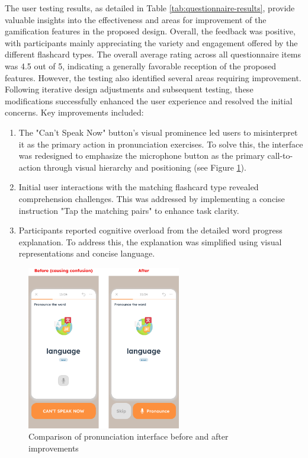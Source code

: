 The user testing results, as detailed in Table \ref{tab:questionnaire-results}, provide valuable insights into the effectiveness and areas for improvement of the gamification features in the proposed design. Overall, the feedback was positive, with participants mainly appreciating the variety and engagement offered by the different flashcard types. The overall average rating across all questionnaire items was 4.5 out of 5, indicating a generally favorable reception of the proposed features. However, the testing also identified several areas requiring improvement. Following iterative design adjustments and subsequent testing, these modifications successfully enhanced the user experience and resolved the initial concerns. Key improvements included:
\begin{enumerate}
    \item The "Can't Speak Now" button's visual prominence led users to misinterpret it as the primary action in pronunciation exercises. To solve this, the interface was redesigned to emphasize the microphone button as the primary call-to-action through visual hierarchy and positioning (see Figure \ref{fig:em-testing-pronunciation-before-after}).
    
    \item Initial user interactions with the matching flashcard 
    type revealed comprehension challenges. This was addressed by implementing a concise instruction "Tap the matching pairs" to enhance task clarity.
    
    \item Participants reported cognitive overload from the detailed word progress explanation. To address this, the explanation was simplified using visual representations and concise language.
\end{enumerate}
\begin{figure}[!h]
    \centering
    \includegraphics[width=0.60\textwidth]{src/figures/em-testing-pronunciation-before-after.png}
    \caption{Comparison of pronunciation interface before and after improvements}
    \label{fig:em-testing-pronunciation-before-after}
\end{figure}

